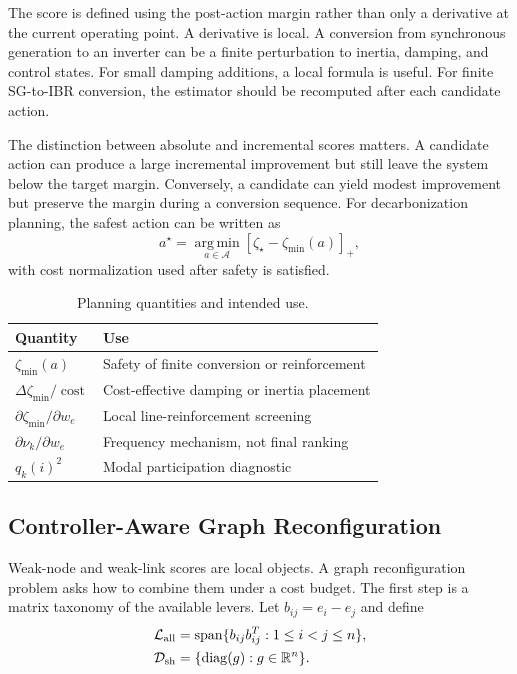 \documentclass[journal]{IEEEtran}
\newcommand{\R}{\mathbb{R}}
\newcommand{\diag}{\operatorname{diag}}
\newcommand{\argmin}{\operatorname*{arg\,min}}
\begin{document}
The score is defined using the post-action margin rather than only a derivative at the current operating point. A derivative is local. A conversion from synchronous generation to an inverter can be a finite perturbation to inertia, damping, and control states. For small damping additions, a local formula is useful. For finite SG-to-IBR conversion, the estimator should be recomputed after each candidate action.

The distinction between absolute and incremental scores matters. A candidate action can produce a large incremental improvement but still leave the system below the target margin. Conversely, a candidate can yield modest improvement but preserve the margin during a conversion sequence. For decarbonization planning, the safest action can be written as
\begin{equation}
a^\star=\argmin_{a\in\mathcal{A}}\left[\zeta_\star-\zeta_{\min}(a)\right]_+,
\end{equation}
with cost normalization used after safety is satisfied.

\begin{table}[t]
\centering
\caption{Planning quantities and intended use.}
\label{tab:planning}
\begin{tabular}{p{}p{}}
\toprule
Quantity & Use\\
\midrule
$\zeta_{\min}(a)$ & Safety of finite conversion or reinforcement\\
$\Delta\zeta_{\min}/\operatorname{cost}$ & Cost-effective damping or inertia placement\\
$\partial\zeta_{\min}/\partial w_e$ & Local line-reinforcement screening\\
$\partial\nu_k/\partial w_e$ & Frequency mechanism, not final ranking\\
$q_k(i)^2$ & Modal participation diagnostic\\
\bottomrule
\end{tabular}
\end{table}

\subsection{Controller-Aware Graph Reconfiguration}

Weak-node and weak-link scores are local objects. A graph reconfiguration problem asks how to combine them under a cost budget. The first step is a matrix taxonomy of the available levers. Let $b_{ij}=e_i-e_j$ and define
\begin{align}
\mathcal{L}_{\rm all}
&=\operatorname{span}\{b_{ij}b_{ij}^T:1\le i<j\le n\},\\
\mathcal{D}_{\rm sh}
&=\{\diag(g):g\in\R^n\}.
\end{align}
\end{document}
